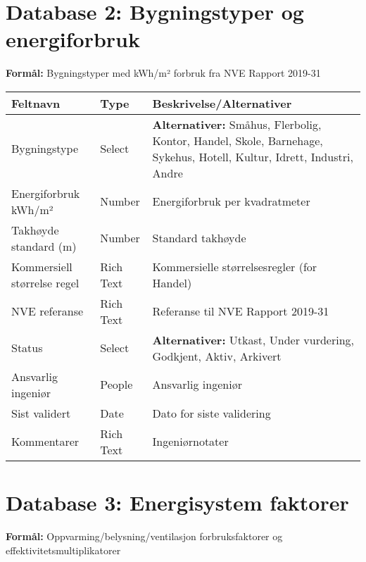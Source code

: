 \documentclass[11pt,a4paper]{article}
\begin{document}
\section{Database 2: Bygningstyper og energiforbruk}

\textbf{Formål:} Bygningstyper med kWh/m² forbruk fra NVE Rapport 2019-31

\begin{longtable}{@{}p{4cm}p{2.5cm}p{8cm}@{}}
\toprule
\textbf{Feltnavn} & \textbf{Type} & \textbf{Beskrivelse/Alternativer} \\
\midrule
Bygningstype & Select & \textbf{Alternativer:} Småhus, Flerbolig, Kontor, Handel, Skole, Barnehage, Sykehus, Hotell, Kultur, Idrett, Industri, Andre \\
\addlinespace
Energiforbruk kWh/m² & Number & Energiforbruk per kvadratmeter \\
\addlinespace
Takhøyde standard (m) & Number & Standard takhøyde \\
\addlinespace
Kommersiell størrelse regel & Rich Text & Kommersielle størrelsesregler (for Handel) \\
\addlinespace
NVE referanse & Rich Text & Referanse til NVE Rapport 2019-31 \\
\addlinespace
Status & Select & \textbf{Alternativer:} Utkast, Under vurdering, Godkjent, Aktiv, Arkivert \\
\addlinespace
Ansvarlig ingeniør & People & Ansvarlig ingeniør \\
\addlinespace
Sist validert & Date & Dato for siste validering \\
\addlinespace
Kommentarer & Rich Text & Ingeniørnotater \\
\bottomrule
\end{longtable}

\section{Database 3: Energisystem faktorer}

\textbf{Formål:} Oppvarming/belysning/ventilasjon forbruksfaktorer og effektivitetsmultiplikatorer
\end{document}
